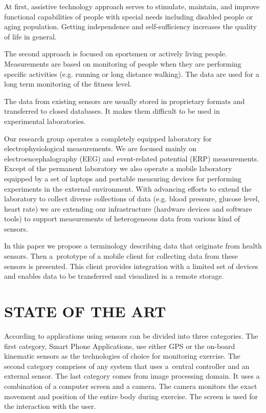\documentclass[a4paper,twoside]{article}
\begin{document}
At first, assistive technology approach serves to stimulate, maintain, and improve functional capabilities of people with special needs including disabled people or aging population. Getting independence and self-sufficiency increases the quality of life in general.

The second approach is focused on sportsmen or actively living people. Measurements are based on monitoring of people when they are performing specific activities (e.g. running or long distance walking). The data are used for a long term monitoring of the fitness level.

The data from existing sensors are usually stored in proprietary formats and transferred to closed databases. It makes them difficult to be used in experimental laboratories.

Our research group operates a completely equipped laboratory \cite{10.3389/fninf.2014.00020} for electrophysiological measurements. We are focused mainly on electroencephalography (EEG) and event-related potential (ERP) measurements. Except of the permanent laboratory we also operate a mobile laboratory equipped by a set of laptops and portable measuring devices for performing experiments in the external environment. With advancing efforts to extend the laboratory to collect diverse collections of data (e.g. blood pressure, glucose level, heart rate) we are extending our infrastructure (hardware devices and software tools) to support  measurements of heterogeneous data from various kind of sensors.

In this paper we propose a terminology describing data that originate from health sensors. Then a~prototype of a mobile client for collecting data from these sensors is presented. This client provides integration with a limited set of devices and enables data to be transferred and visualized in a remote storage.

\section{\uppercase{state of the art}}
\label{sec:state-of-the-art}

\noindent
According to \cite{Lowe2012242} applications using sensors can be divided into three categories. The first category, Smart Phone Applications, use either GPS or the
on-board kinematic sensors as the technologies of choice for monitoring exercise. The second category comprises of any system that uses a~central controller
and an external sensor. The last category comes from image processing domain. It uses a combination of a computer screen and a camera. The camera monitors the exact movement and position of the entire body during exercise. The screen is used for the interaction with the user.
\end{document}
